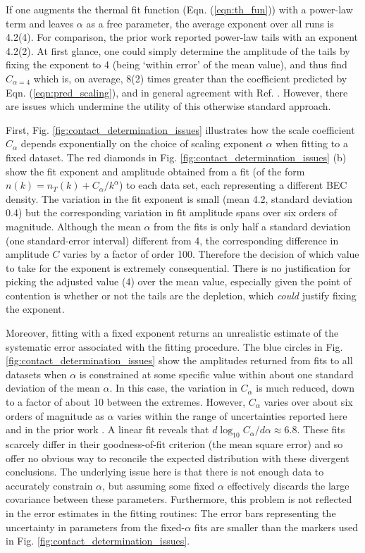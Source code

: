	
	If one augments the {thermal} fit function (Eqn. (\ref{eqn:th_fun})) with a power-law term and leaves $\alpha$ as a free parameter, the average exponent over all runs is 4.2(4). 
	For comparison, the prior work \cite{Chang16} reported power-law tails with an exponent 4.2(2).
	At first glance, one could simply determine the amplitude of the tails by fixing the exponent to 4 (being `within error' of the mean value), and thus find $C_{\alpha=4}$ which is, on average, 8(2) times greater than the coefficient predicted by Eqn. (\ref{eqn:pred_scaling}), and in general agreement with Ref. \cite{Chang16}.
	However, there are issues which undermine the utility of this otherwise standard approach.

	First, Fig. \ref{fig:contact_determination_issues} illustrates how the scale coefficient $C_\alpha$ depends exponentially on the choice of scaling exponent $\alpha$ when fitting to a fixed dataset.
	The red diamonds in Fig. \ref{fig:contact_determination_issues} (b) show the fit exponent and amplitude obtained from a fit (of the form ${n(k)} %
	= n_T(k) + C_\alpha/k^\alpha$) to each data set, each representing a different BEC density. 
	The variation in the fit exponent is small (mean 4.2, standard deviation 0.4) but the corresponding variation in fit amplitude spans over six orders of magnitude.
	Although the mean $\alpha$ from the fits is only half a standard deviation (one standard-error interval) different from 4, the corresponding difference in amplitude $C$ varies by a factor of order 100.
	Therefore the decision of which value to take for the exponent is extremely consequential. 
	There is no justification for picking the adjusted value (4) over the mean value, especially given the point of contention is whether or not the tails are the depletion, which \emph{could} justify fixing the exponent.
	
	Moreover, fitting with a fixed exponent returns an unrealistic estimate of the systematic error associated with the fitting procedure.
	The blue circles in Fig. \ref{fig:contact_determination_issues} show the amplitudes returned from fits to all datasets when $\alpha$ is constrained at some specific value within about one standard deviation of the mean $\alpha$. 
	In this case, the variation in $C_\alpha$ is much reduced, down to a factor of about 10 between the extremes.
	However, $C_\alpha$ varies over about six orders of magnitude as $\alpha$ varies within the range of uncertainties reported here and in the prior work \cite{Chang16}. 
	A linear fit reveals that $d \log_{10} C_\alpha/d\alpha \approx 6.8$.
	These fits scarcely differ in their goodness-of-fit criterion (the mean square error) and so offer no obvious way to reconcile the expected distribution with these divergent  conclusions.
	The underlying issue here is that there is not enough data to accurately constrain $\alpha$, but assuming some fixed $\alpha$ effectively discards the large covariance between these parameters.
	Furthermore, this problem is not reflected in the error estimates in the fitting routines: The error bars representing the uncertainty in parameters from the fixed-$\alpha$ fits are smaller than the markers used in Fig. \ref{fig:contact_determination_issues}. 
		
